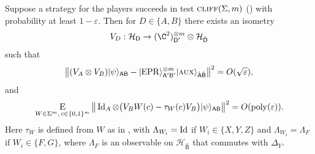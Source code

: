 \documentclass{toc}
\newcommand{\ket}[1]{|#1\rangle}
\newcommand{\Id}{\ensuremath{\mathop{\rm Id}\nolimits}}
\newcommand{\Es}[1]{\ensuremath{\mathop{\textsc{E}}}_{#1}} %
\DeclareMathOperator{\poly}{poly}
\newcommand{\reg}[1]{{\textsf{#1}}}
\newcommand{\mH}{\mathcal{H}}
\newcommand{\eps}{\varepsilon}
\newcommand{\EPR}{{\rm EPR}}
\newcommand{\aux}{\textsc {aux}}
\newcommand{\cliff}{\textsc{cliff}}
\newcommand{\phase}{\Lambda}
\begin{document}
\newpage  %

\begin{theorem}\label{thm:clifford-ntest}
Suppose a strategy for the players succeeds in test $\cliff(\Sigma,m)$ () with probability at least $1-\eps$. Then  for $D\in\{A,B\}$ there exists an isometry 
$$V_D: \mathcal{H}_\reg{D} \to (\C^2)^{\otimes m}_{\reg{D}'} \otimes {\mH}_{\hat{\reg{D}}}$$
such that 
\begin{equation}\label{eq:psi-epr}
\big\| (V_A \otimes V_B) \ket{\psi}_{\reg{AB}} - \ket{\EPR}_{\reg{A}'\reg{B}'}^{\otimes m} \ket{\aux}_{\hat{\reg{A}}\hat{\reg{B}}} \big\|^2 = O(\sqrt{\eps}),
\end{equation}
and \begin{equation}\label{eq:clifford-ntest-close}
\Es{W\in\Sigma^m,\,c\in\{0,1\}^m} \big\| \Id_A \otimes \big( V_B W(c) - \tau_{W}(c) V_B\big)   \ket{\psi}_{\reg{AB}} \big\|^2 = O(\poly(\eps)).
\end{equation}
Here $\tau_W$ is defined from $W$ as in , with $\phase_{W_i} = \Id$ if $W_i\in \{X,Y,Z\}$ and $\phase_{W_i} = \phase_F$ if $W_i\in\{F,G\}$, where $\phase_F$ is an  observable on ${\mH}_{\hat{\reg{B}}}$ that commutes with $\Delta_Y$. 
\end{theorem}
\end{document}
